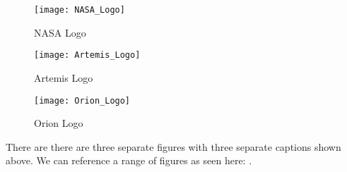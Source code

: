 \begin{minipage}[c]{0.33\textwidth}
   \begin{figure}[H]
      \centering
      \texttt{[image: NASA\_Logo]}
      \caption{NASA Logo} 
      \label{fig:nasa-logo}
   \end{figure}
\end{minipage}%
\begin{minipage}[c]{0.33\textwidth}
   \begin{figure}[H]
      \centering
      \texttt{[image: Artemis\_Logo]}
      \caption{Artemis Logo} 
      \label{fig:artemis-logo}
   \end{figure}
\end{minipage}
\begin{minipage}[c]{0.33\textwidth}
   \begin{figure}[H]
      \centering
      \texttt{[image: Orion\_Logo]}
      \caption{Orion Logo} 
      \label{fig:orion-logo}
   \end{figure}
\end{minipage}

\vspace{\baselineskip}

There are there are three separate figures with three separate captions shown above.
We can reference a range of figures as seen here: .